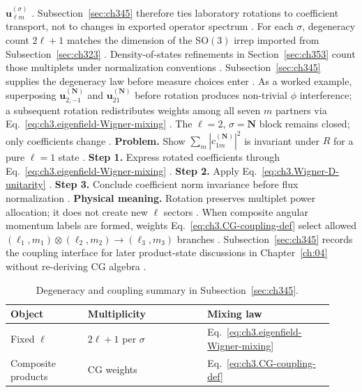 \(\mathbf{u}_{\ell m}^{(\sigma)}\) \cite{hansen1988}. Subsection~\ref{sec:ch345} therefore ties laboratory
rotations to coefficient transport, not to changes in exported operator spectrum \cite{stratton1941}.
For each \(\sigma\), degeneracy count \(2\ell+1\) matches the dimension of the SO\((3)\) irrep imported from
Subsection~\ref{sec:ch323} \cite{jackson1999}. Density-of-states refinements in Section~\ref{sec:ch353}
count those multiplets under normalization conventions \cite{stratton1941}. Subsection~\ref{sec:ch345}
supplies the degeneracy law before measure choices enter \cite{hansen1988}.
As a worked example, superposing \(\mathbf{u}_{2,-1}^{(\mathbf{N})}\) and \(\mathbf{u}_{21}^{(\mathbf{N})}\) before rotation produces
non-trivial \(\phi\) interference; a subsequent rotation redistributes weights among all seven \(m\) partners via
Eq.~\eqref{eq:ch3.eigenfield-Wigner-mixing} \cite{jackson1999}. The \(\ell=2\), \(\sigma=\mathbf{N}\) block
remains closed; only coefficients change \cite{stratton1941}.
\textbf{Problem.} Show \(\sum_{m}|c_{1m}^{(\mathbf{N})}|^{2}\) is invariant under \(R\) for a pure \(\ell=1\) state
\cite{hansen1988}.
\textbf{Step 1.} Express rotated coefficients through Eq.~\eqref{eq:ch3.eigenfield-Wigner-mixing} \cite{hansen1988}.
\textbf{Step 2.} Apply Eq.~\eqref{eq:ch3.Wigner-D-unitarity} \cite{jackson1999}.
\textbf{Step 3.} Conclude coefficient norm invariance before flux normalization \cite{stratton1941}.
\textbf{Physical meaning.} Rotation preserves multiplet power allocation; it does not create new \(\ell\) sectors
\cite{harrington2001}.
When composite angular momentum labels are formed, weights Eq.~\eqref{eq:ch3.CG-coupling-def} select allowed
\((\ell_1,m_1)\otimes(\ell_2,m_2)\to(\ell_3,m_3)\) branches \cite{jackson1999}. Subsection~\ref{sec:ch345}
records the coupling interface for later product-state discussions in Chapter~\ref{ch:04} without re-deriving CG
algebra \cite{hansen1988}.
\begin{table}[t]
\centering
\caption{Degeneracy and coupling summary in Subsection~\ref{sec:ch345}.}
\label{tab:ch3.345-degeneracy-coupling}
\small
\begin{tabular}{@{}p{0.22\linewidth}p{0.34\linewidth}p{0.36\linewidth}@{}}
\toprule
Object & Multiplicity & Mixing law \\
\midrule
Fixed \(\ell\) & \(2\ell+1\) per \(\sigma\) & Eq.~\eqref{eq:ch3.eigenfield-Wigner-mixing} \\
Composite products & CG weights & Eq.~\eqref{eq:ch3.CG-coupling-def} \\
\bottomrule
\end{tabular}
\end{table}
